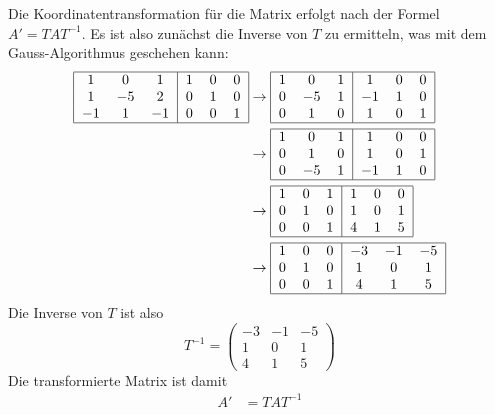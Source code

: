 \begin{loesung}
Die Koordinatentransformation für die Matrix erfolgt nach der Formel $A'=TAT^{-1}$.
Es ist also zunächst die Inverse von $T$ zu ermitteln, was mit dem Gauss-Algorithmus
geschehen kann:
\begin{align*}
\begin{tabular}{|ccc|ccc|}
\hline
   1 &  0 &  1 &1&0&0\\
   1 &$-5$&  2 &0&1&0\\
 $-1$&  1 &$-1$&0&0&1\\
\hline
\end{tabular}
&\rightarrow
\begin{tabular}{|ccc|ccc|}
\hline
   1 &  0 &  1 &  1 &0&0\\
   0 &$-5$&  1 &$-1$&1&0\\
   0 &  1 &  0 &  1 &0&1\\
\hline
\end{tabular}
\\
&\rightarrow
\begin{tabular}{|ccc|ccc|}
\hline
   1 &  0 &  1 &  1 &0&0\\
   0 &  1 &  0 &  1 &0&1\\
   0 &$-5$&  1 &$-1$&1&0\\
\hline
\end{tabular}
\\
&\rightarrow
\begin{tabular}{|ccc|ccc|}
\hline
   1 &  0 &  1 &  1 &0&0\\
   0 &  1 &  0 &  1 &0&1\\
   0 &  0 &  1 &  4 &1&5\\
\hline
\end{tabular}
\\
&\rightarrow
\begin{tabular}{|ccc|ccc|}
\hline
   1 &  0 &  0 &$-3$&$-1$&$-5$\\
   0 &  1 &  0 &  1 &  0 &  1\\
   0 &  0 &  1 &  4 &  1 &  5\\
\hline
\end{tabular}
\end{align*}
Die Inverse von $T$ ist also
\[
T^{-1}
=
\begin{pmatrix}
  -3& -1& -5\\
   1&  0&  1\\
   4&  1&  5
\end{pmatrix}
\]
Die transformierte Matrix ist damit
\begin{align*}
A'&=TAT^{-1}
\\

\end{align*}
\end{loesung}
